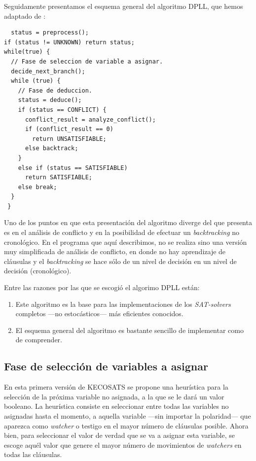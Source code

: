 \documentclass[12pt,lettersize,oneside]{article}
\begin{document}
Seguidamente presentamos el esquema general del algoritmo DPLL, que hemos
adaptado de \cite{Zhang}:

\begin{lstlisting}
  status = preprocess(); 
if (status != UNKNOWN) return status; 
while(true) { 
  // Fase de seleccion de variable a asignar.
  decide_next_branch(); 
  while (true) { 
    // Fase de deduccion.
    status = deduce(); 
    if (status == CONFLICT) { 
      conflict_result = analyze_conflict(); 
      if (conflict_result == 0) 
        return UNSATISFIABLE; 
      else backtrack; 
    } 
    else if (status == SATISFIABLE) 
      return SATISFIABLE; 
    else break; 
  } 
 } 
\end{lstlisting}
\vspace{-2.5mm}

Uno de los puntos en que esta presentación del algoritmo diverge del que
presenta \cite{Zhang} es en el análisis de conflicto y en la posibilidad de
efectuar un \emph{backtracking} no cronológico. En el programa que aquí
describimos, no se realiza sino una versión muy simplificada de análisis de
conflicto, en donde no hay aprendizaje de cláusulas y el \emph{backtracking} se
hace sólo de un nivel de decisión en un nivel de decisión (cronológico).

Entre las razones por las que se escogió el algorimo DPLL están:
\begin{enumerate}
\item Este algoritmo es la base para las implementaciones de los
  \emph{SAT-solvers} completos ---no estocásticos--- más eficientes conocidos.
\item El esquema general del algoritmo es bastante sencillo de implementar como
  de comprender.
\end{enumerate}
\subsection{Fase de selección de variables a asignar}\label{ProxVariable}

En esta primera versión de KECOSATS se propone una heurística para la selección
de la próxima variable no asignada, a la que se le dará un valor booleano. La
heurística consiste en seleccionar entre todas las variables no asignadas hasta
el momento, a aquella variable ---sin importar la polaridad--- que aparezca como
\emph{watcher} o testigo en el mayor número de cláusulas posible. Ahora bien,
para seleccionar el valor de verdad que se va a asignar esta variable, se escoge
aquél valor que genere el mayor número de movimientos de \emph{watchers} en
todas las cláusulas.
\end{document}

